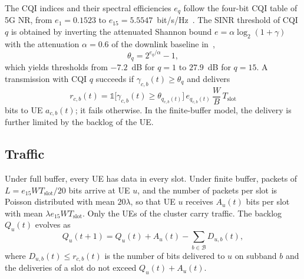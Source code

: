 \documentclass{ieeeaccess}
\begin{document}
The CQI indices and their spectral efficiencies $e_q$ follow the four-bit CQI table of 5G NR, from $e_1 = 0.1523$ to $e_{15} = 5.5547$~bit/s/Hz~\cite[Table~5.2.2.1-2]{3gpp38214}. The SINR threshold of CQI $q$ is obtained by inverting the attenuated Shannon bound $e = \alpha \log_2(1 + \gamma)$ with the attenuation $\alpha = 0.6$ of the downlink baseline in~\cite[Annex~A]{3gpp36942},
\begin{equation}
\theta_q = 2^{e_q/\alpha} - 1,
\label{eq:threshold}
\end{equation}
which yields thresholds from $-7.2$~dB for $q = 1$ to $27.9$~dB for $q = 15$. A transmission with CQI $q$ succeeds if $\gamma_{c,b}(t) \ge \theta_q$ and delivers
\begin{equation}
r_{c,b}(t) = \mathbb{1}\bigl[\gamma_{c,b}(t) \ge \theta_{q_{c,b}(t)}\bigr]\, e_{q_{c,b}(t)}\, \frac{W}{B}\, T_{\text{slot}}
\label{eq:rate}
\end{equation}
bits to UE $a_{c,b}(t)$; it fails otherwise. In the finite-buffer model, the delivery is further limited by the backlog of the UE.

\subsection{Traffic}
Under full buffer, every UE has data in every slot. Under finite buffer, packets of $L = e_{15} W T_{\text{slot}}/20$ bits arrive at UE $u$, and the number of packets per slot is Poisson distributed with mean $20\lambda$, so that UE $u$ receives $A_u(t)$ bits per slot with mean $\lambda e_{15} W T_{\text{slot}}$. Only the UEs of the cluster carry traffic. The backlog $Q_u(t)$ evolves as
\begin{equation}
Q_u(t+1) = Q_u(t) + A_u(t) - \sum_{b \in \mathcal{B}} D_{u,b}(t),
\label{eq:queue}
\end{equation}
where $D_{u,b}(t) \le r_{c,b}(t)$ is the number of bits delivered to $u$ on subband $b$ and the deliveries of a slot do not exceed $Q_u(t) + A_u(t)$.
\end{document}
